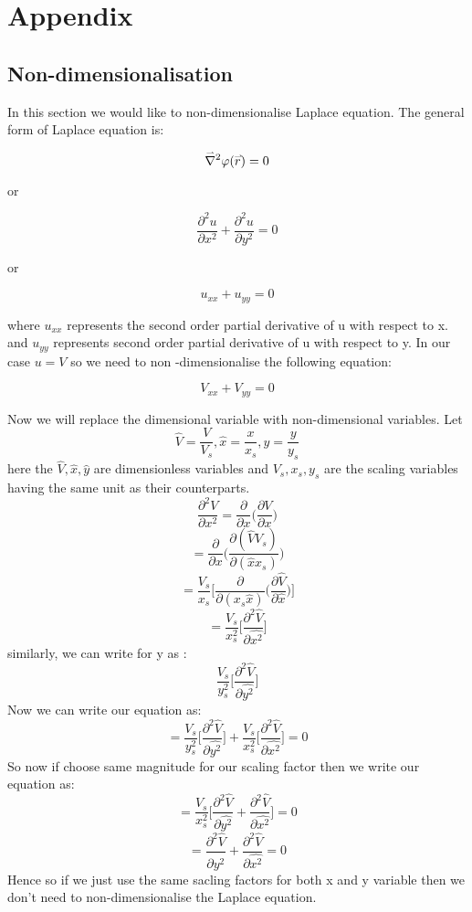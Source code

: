 \section{Appendix}
\subsection{Non-dimensionalisation}
In this section we would like to non-dimensionalise Laplace equation. The general form of Laplace equation is:
		\begin{center}
			$$\accentset{\rightharpoonup}{\nabla}^2 \varphi(\accentset{\rightharpoonup}{r}) = 0$$
		\end{center}
		\noindent
		or 
		\begin{center}
			\[  
			\frac{\partial^2 u}{\partial x^2} + \frac{\partial^2 u}{\partial y^2} = 0
			\]
		\end{center}
		or 
		\begin{center}
			\[u_{xx} + u_{yy} = 0 \]
		\end{center}
	\noindent
	where \textbf{$ u_{xx} $} represents the second order partial derivative of u with respect to x.
	and $ u_{yy} $ represents second order partial derivative of u with respect to y.
	In our case $ u = V $ so we need to non -dimensionalise the following equation:
	\begin{center}
			\[V_{xx} + V_{yy} = 0 \]
	\end{center}
	\noindent 
	Now we will replace the dimensional variable with non-dimensional variables. Let \[\hat{V} = \frac{V}{V_s},  \hat{x} = \frac{x}{x_s},  \hat{y} = \frac{y}{y_s}\]
	\noindent
	here the $ \hat{V}, \hat{x}, \hat{y} $ are dimensionless variables and $ V_s, x_s, y_s$ are the scaling variables having the same unit as their counterparts.
	\[  
	\frac{\partial^2 V}{\partial x^2} = \frac{\partial}{\partial x} \Bigg({ \frac{\partial V}{\partial x}}\Bigg) \]
	\[ = \frac{\partial}{\partial x} \bigg(\frac{\partial (\hat{V}V_s)}{\partial (\hat{x}x_s)}\bigg) \]
	\[ = \frac{V_s}{x_s} \Big[{\frac{\partial}{\partial (x_s \hat{x})}} \Big({\frac{\partial \hat{V}}{\partial \hat{x}}}\Big)\Big]\]
	\[ = \frac{V_s}{x_s^2} \Big[{\frac{\partial^2 \hat{V}}{\partial \hat{x^2}}}\Big]\]
	\noindent
	similarly, we can write for y as : 
	\[\frac{V_s}{y_s^2} \Big[{\frac{\partial^2 \hat{V}}{\partial \hat{y^2}}}\Big]\]
	\noindent
	Now we can write our equation as:
	\[ = \frac{V_s}{y_s^2} \Big[{\frac{\partial^2 \hat{V}}{\partial \hat{y^2}}}\Big] + \frac{V_s}{x_s^2} \Big[{\frac{\partial^2 \hat{V}}{\partial \hat{x^2}}}\Big] = 0 \]
	So now if choose same magnitude for our scaling factor then we write our equation as:
	\[ = \frac{V_s}{x_s^2} \Big[{\frac{\partial^2 \hat{V}}{\partial \hat{y^2}}} +  {\frac{\partial^2 \hat{V}}{\partial \hat{x^2}}}\Big] = 0 \]
	\[ = {\frac{\partial^2 \hat{V}}{\partial \hat{y^2}}} +  {\frac{\partial^2 \hat{V}}{\partial \hat{x^2}}} = 0 \]
	Hence so if we just use the same sacling factors for both x and y variable then we don't need to non-dimensionalise the Laplace equation.
